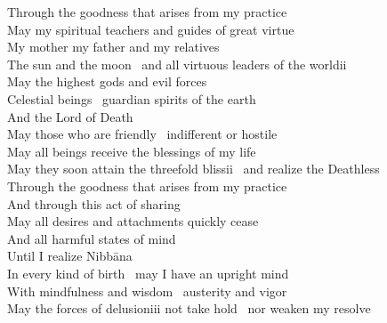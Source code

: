\begin{english}
  Through the goodness that arises from my practice\\
  May my spiritual teachers and guides of great virtue\\
  My mother my father and my relatives\\
  The sun and the moon \breathmark\ and all virtuous leaders of the worldii\\
  May the highest gods and evil forces\\
  Celestial beings \breathmark\ guardian spirits of the earth\\
  And the Lord of Death\\
  May those who are friendly \breathmark\ indifferent or hostile\\
  May all beings receive the blessings of my life\\
  May they soon attain the threefold blissii \breathmark\ and realize the Deathless\\
  Through the goodness that arises from my practice\\
  And through this act of sharing\\
  May all desires and attachments quickly cease\\
  And all harmful states of mind\\
  Until I realize Nibbāna\\
  In every kind of birth \breathmark\ may I have an upright mind\\
  With mindfulness and wisdom \breathmark\ austerity and vigor\\
  May the forces of delusioniii not take hold \breathmark\ nor weaken my resolve\\

\end{english}
